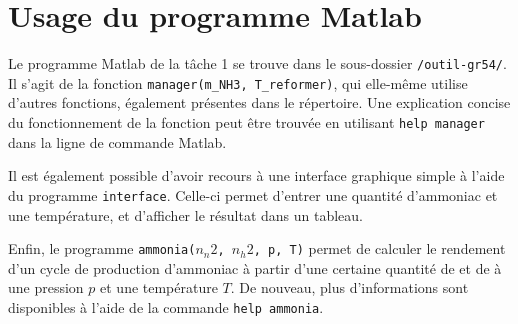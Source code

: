 \section{Usage du programme Matlab}

Le programme Matlab de la tâche 1 se trouve dans le sous-dossier \texttt{/outil-gr54/}. Il s'agit de la fonction \texttt{manager(m\_NH3, T\_reformer)}, qui elle-même utilise d'autres fonctions, également présentes dans le répertoire. Une explication concise du fonctionnement de la fonction peut être trouvée en utilisant \texttt{help manager} dans la ligne de commande Matlab.

Il est également possible d'avoir recours à une interface graphique simple à l'aide du programme \texttt{interface}. Celle-ci permet d'entrer une quantité d'ammoniac et une température, et d'afficher le résultat dans un tableau.

Enfin, le programme \texttt{ammonia($n_n2$, $n_h2$, p, T)} permet de calculer le rendement d'un cycle de production d'ammoniac à partir d'une certaine quantité de  et de  à une pression $p$ et une température $T$. De nouveau, plus d'informations sont disponibles à l'aide de la commande \texttt{help ammonia}.

